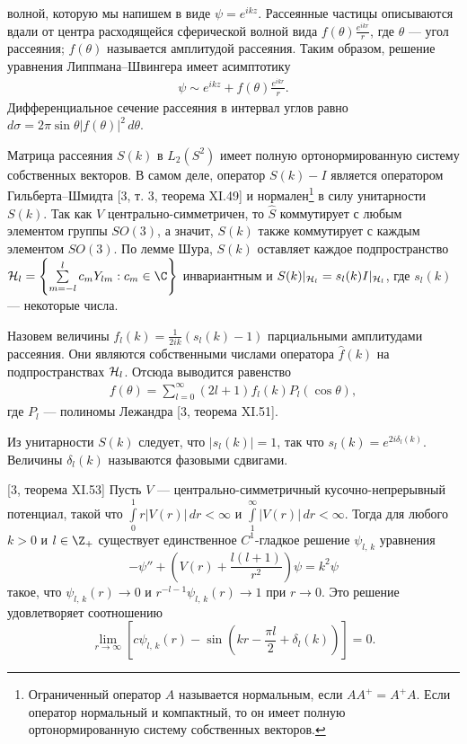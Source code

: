 \documentclass[a4paper
]{article}
\begin{document}
волной, которую мы напишем в виде $\psi=e^{ikz}$. Рассеянные частицы
описываются вдали от центра расходящейся сферической волной вида $f(\theta)
\frac{e^{ikr}}{r}$, где $\theta$ --- угол рассеяния; $f(\theta)$ называется
амплитудой рассеяния. Таким образом, решение уравнения Липпмана--Швингера
имеет асимптотику
\begin{align}
\label{rass_cent_sym}
\psi\sim e^{ikz}+f(\theta)\frac{e^{ikr}}{r}.
\end{align}
Дифференциальное сечение рассеяния в интервал углов равно $d\sigma=2\pi
\sin \theta |f(\theta)|^2\, d\theta$. \par
Матрица рассеяния $S(k)$ в $L_2(S^2)$ имеет полную ортонормированную
систему собственных векторов. В самом деле, оператор $S(k)-I$
является оператором Гильберта--Шмидта [3, т. 3, теорема XI.49]
и нормален\footnote{Ограниченный оператор $A$ называется нормальным, если $AA^+=
A^+A$. Если оператор нормальный и компактный, то он имеет полную
ортонормированную систему собственных векторов.} в силу унитарности $S(k)$.
Так как $V$ центрально-симметричен,
то $\hat S$ коммутирует с любым элементом группы $SO(3)$, а значит, $S(k)$
также коммутирует с каждым элементом $SO(3)$. По лемме Шура, $S(k)$
оставляет каждое подпространство ${\cal H}_l=\left\{\sum\limits_{m=-l}
^l c_mY_{lm}:c_m\in \C\right\}$ инвариантным и $S(k)|_{{\cal H}_l}
=s_l(k)I|_{{\cal H}_l}$, где $s_l(k)$ --- некоторые числа. \par
Назовем величины $f_l(k)=\frac{1}{2ik}(s_l(k)-1)$ парциальными амплитудами
рассеяния. Они являются собственными числами оператора $\hat f(k)$
на подпространствах ${\cal H}_l$. Отсюда выводится равенство
\begin{align}
\label{ampl_rass_centr}
f(\theta)=\sum \limits_{l=0}^\infty (2l+1)f_l(k)P_l(\cos \theta),
\end{align}
где $P_l$ --- полиномы Лежандра [3, теорема XI.51]. \par
Из унитарности $S(k)$ следует, что $|s_l(k)|=1$, так что $s_l(k)=e^{2i
\delta_l(k)}$. Величины $\delta_l(k)$ называются фазовыми сдвигами.
\begin{Trm}
\label{thm1153}
{\rm [3, теорема XI.53]}
Пусть $V$ --- центрально-симметричный кусочно-непрерывный потенциал,
такой что $\int \limits_0^1r|V(r)|\, dr<\infty$ и $\int \limits_1^\infty
|V(r)|\, dr<\infty$. Тогда для любого $k>0$ и $l\in \Z_+$
существует единственное $C^1$-гладкое решение $\psi_{l, \, k}$
уравнения $$-\psi''+\left(V(r)+\frac{l(l+1)}{r^2}\right)\psi=k^2\psi$$
такое, что $\psi_{l,\, k}(r)\rightarrow 0$ и $r^{-l-1}\psi_{l,\, k}(r)
\rightarrow 1$ при $r\rightarrow 0$. Это решение удовлетворяет
соотношению $$\lim \limits_{r\rightarrow \infty}\left[c\psi_{l, \, k}(r)-
\sin\left(kr-\frac{\pi l}{2}+\delta_l(k)\right)\right]=0.$$
\end{Trm}
\end{document}
